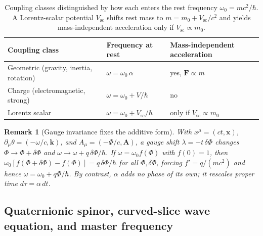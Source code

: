 \documentclass[aps,prd,onecolumn,tightenlines,nofootinbib,notitlepage,10pt,floatfix]{revtex4-2}
\theoremstyle{indentedtheorem}
\newtheorem{remark}{Remark}
\begin{document}
\begin{table}[htbp]
\centering
\footnotesize
\caption{Coupling classes distinguished by how each enters the rest frequency $\omega_0=mc^2/\hbar$. A Lorentz-scalar potential $V_\text{sc}$ shifts rest mass to $m=m_0+V_\text{sc}/c^2$ and yields mass-independent acceleration only if $V_\text{sc}\propto m_0$.}
\label{tab:classes}
\begin{tabular}{lll}
\toprule
\textbf{Coupling class} & \textbf{Frequency at rest} & \textbf{Mass-independent acceleration} \\
\midrule
Geometric (gravity, inertia, rotation) & $\omega=\omega_0\,\alpha$ & yes, $\mathbf{F}\propto m$ \\
Charge (electromagnetic, strong) & $\omega=\omega_0+V/\hbar$ & no \\
Lorentz scalar & $\omega=\omega_0+V_\text{sc}/\hbar$ & only if $V_\text{sc}\propto m_0$ \\
\bottomrule
\end{tabular}
\end{table}

\begin{remark}[Gauge invariance fixes the additive form]\label{rem:additivity}
With $x^\mu=(ct,\mathbf{x})$, $\partial_\mu\theta=(-\omega/c,\mathbf{k})$, and $A_\mu=(-\Phi/c,\mathbf{A})$, a gauge shift $\lambda=-t\,\delta\Phi$ changes $\Phi\to\Phi+\delta\Phi$ and $\omega\to\omega+q\,\delta\Phi/\hbar$. If $\omega=\omega_0 f(\Phi)$ with $f(0)=1$, then $\omega_0[f(\Phi+\delta\Phi)-f(\Phi)]=q\,\delta\Phi/\hbar$ for all $\Phi,\delta\Phi$, forcing $f'=q/(mc^2)$ and hence $\omega=\omega_0+q\Phi/\hbar$. By contrast, $\alpha$ adds no phase of its own; it rescales proper time $d\tau=\alpha\,dt$.
\end{remark}

\subsection{Quaternionic spinor, curved-slice wave equation, and master frequency}
\label{sec:spinor}
\end{document}
